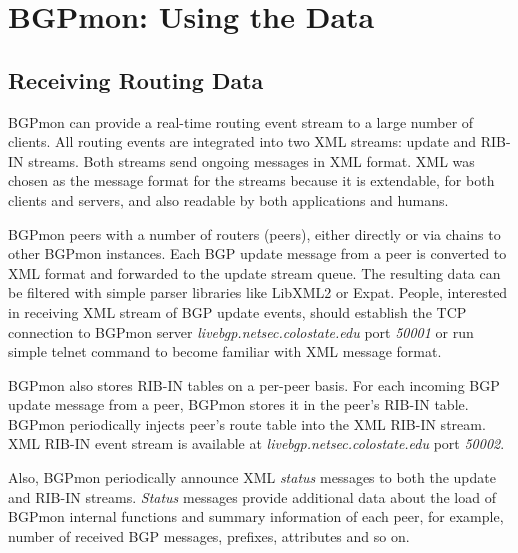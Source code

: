 \section{BGPmon: Using the Data}
\label{sec:usage}

\subsection{Receiving Routing Data}
BGPmon can provide a real-time routing event stream to a large number of clients. All routing events are integrated into two XML streams: update and RIB-IN streams. Both streams send ongoing messages in XML format. XML was chosen as the message format for the streams because it is extendable, for both clients and servers, and also readable by both applications and humans. 

BGPmon peers with a number of routers (peers),  either directly or via chains to other BGPmon instances.   Each BGP update message\cite{bgprfc} from a peer is converted to XML format and forwarded to the update stream queue.    The resulting data can be filtered with simple parser libraries like LibXML2\cite{libxml2} or Expat\cite{expat}.  People, interested in receiving XML stream of BGP update events, should establish the TCP connection to BGPmon server \emph{livebgp.netsec.colostate.edu} port \emph{50001} or run simple telnet command to become familiar with XML message format.

BGPmon also stores RIB-IN tables on a per-peer basis. For each incoming BGP update message from a peer, BGPmon stores it in the peer's RIB-IN table. BGPmon periodically injects peer's route table into the XML RIB-IN stream. 
XML RIB-IN event stream is available at \emph{livebgp.netsec.colostate.edu} port \emph{50002}. 

Also, BGPmon periodically announce XML \emph{status} messages to both the update and RIB-IN streams. \emph{Status} messages provide additional data about the load of BGPmon internal functions and summary information of each peer, for example, number of received BGP messages, prefixes, attributes and so on.


